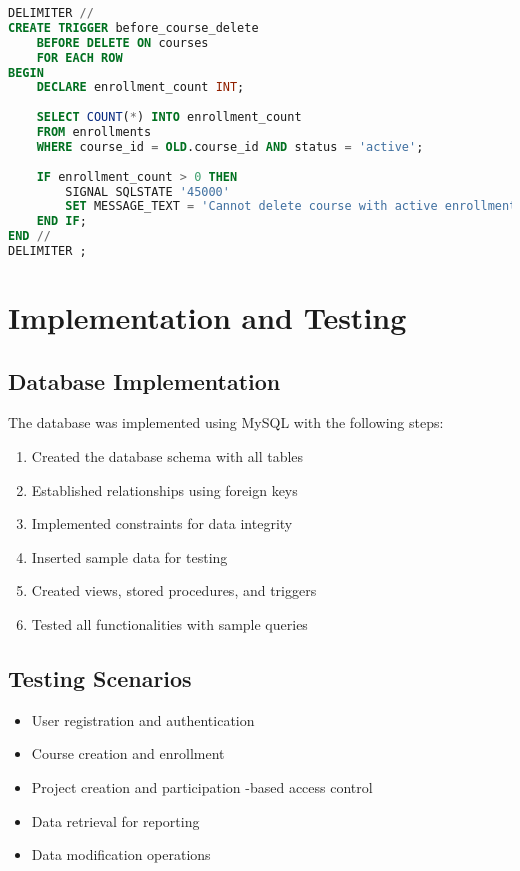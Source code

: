 \documentclass[12pt]{report}
\begin{document}
    \begin{lstlisting}[language=SQL, caption=Trigger to Prevent Course Deletion with Active Enrollments]
DELIMITER //
CREATE TRIGGER before_course_delete
    BEFORE DELETE ON courses
    FOR EACH ROW
BEGIN
    DECLARE enrollment_count INT;
    
    SELECT COUNT(*) INTO enrollment_count
    FROM enrollments
    WHERE course_id = OLD.course_id AND status = 'active';
    
    IF enrollment_count > 0 THEN
        SIGNAL SQLSTATE '45000'
        SET MESSAGE_TEXT = 'Cannot delete course with active enrollments';
    END IF;
END //
DELIMITER ;
    \end{lstlisting}
    
    \chapter{Implementation and Testing}
    
    \section{Database Implementation}
    The database was implemented using MySQL with the following steps:
    \begin{enumerate}
        \item Created the database schema with all tables
        \item Established relationships using foreign keys
        \item Implemented constraints for data integrity
        \item Inserted sample data for testing
        \item Created views, stored procedures, and triggers
        \item Tested all functionalities with sample queries
    \end{enumerate}
    
    \section{Testing Scenarios}
    \begin{itemize}
        \item User registration and authentication
        \item Course creation and enrollment
        \item Project creation and participation
        \role-based access control
        \item Data retrieval for reporting
        \item Data modification operations
    \end{itemize}
    
\end{document}

